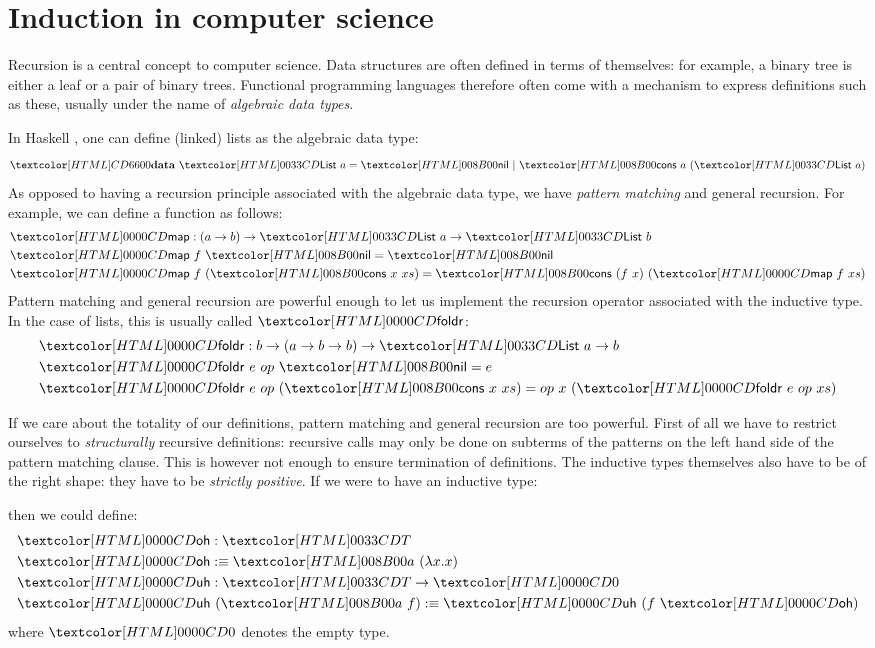 \section{Induction in computer science}

Recursion is a central concept to computer science. Data structures
are often defined in terms of themselves: for example, a binary tree
is either a leaf or a pair of binary trees. Functional programming
languages therefore often come with a mechanism to express definitions
such as these, usually under the name of \emph{algebraic data types}.

In Haskell \cite{Jones2003}, one can define (linked) lists as the
algebraic data type:
$$
\data\ \List\ a = \listnil\ |\ \listcons\ a\ (\List\ a)
$$
As opposed to having a recursion principle associated with the
algebraic data type, we have \emph{pattern matching} and general
recursion. For example, we can define a function as follows:
%
\begin{align*}
  &\listmap : (a \to b) \to \List\ a \to \List\ b \\
  &\listmap\ f\ \listnil = \listnil \\
  &\listmap\ f\ (\listcons\ x\ xs) = \listcons\ (f\ x)\ (\listmap\ f\ xs)
\end{align*}
%
Pattern matching and general recursion are powerful enough to let us
implement the recursion operator associated with the inductive
type. In the case of lists, this is usually called $\listfoldr$:
%
\begin{align*}
  &\listfoldr : b \to (a \to b \to b) \to \List\ a \to b \\
  &\listfoldr\ e\ op\ \listnil = e \\
  &\listfoldr\ e\ op\ (\listcons\ x\ xs) = op\ x\ (\listfoldr\ e\ op\ xs)
\end{align*}
%

If we care about the totality of our definitions, pattern matching and
general recursion are too powerful. First of all we have to restrict
ourselves to \emph{structurally} recursive definitions: recursive
calls may only be done on subterms of the patterns on the left hand
side of the pattern matching clause. This is however not enough to
ensure termination of definitions. The inductive types themselves also
have to be of the right shape: they have to be \emph{strictly
  positive}. If we were to have an inductive type:
%
\begin{datatype}{\Tty}{\Type}
  \constr{\Ta}{(\Tty \to \Tty) \to \Tty}
\end{datatype}
then we could define:
%
\begin{align*}
  &\oh : \Tty \\
  &\oh \ddefeq \Ta\ (\lambda x . x)
  \\
  &\uh : \Tty \to \emptyty \\
  &\uh\ (\Ta\ f) \ddefeq \uh\ (f\ \oh)
\end{align*}
%
where $\emptyty$ denotes the empty type.

